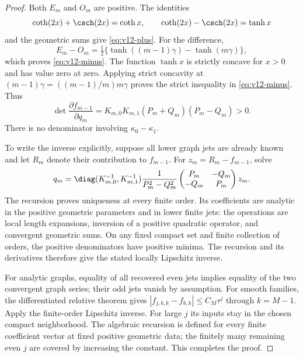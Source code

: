 \begin{proof}
Both $E_m$ and $O_m$ are positive. The identities
\[
 \coth(2x)+\csch(2x)=\coth x,\qquad
 \coth(2x)-\csch(2x)=\tanh x
\]
and the geometric sums give \eqref{eq:v12-plus}. For the difference,
\[
 E_m-O_m=\tfrac12\{\tanh((m-1)\gamma)-\tanh(m\gamma)\},
\]
which proves \eqref{eq:v12-minus}. The function $\tanh x$ is
strictly concave for $x>0$ and has value zero at zero. Applying
strict concavity at $(m-1)\gamma=((m-1)/m)m\gamma$ proves the
strict inequality in \eqref{eq:v12-minus}. Thus
\[
 \det\frac{\partial f_{m-1}}{\partial q_m}
       =K_{m,0}K_{m,1}(P_m+Q_m)(P_m-Q_m)>0.
\]
There is no denominator involving $\kappa_0-\kappa_1$.

To write the inverse explicitly, suppose all lower graph jets are
already known and let $R_m$ denote their contribution to $f_{m-1}$.
For $z_m=R_m-f_{m-1}$, solve
\begin{equation}\label{eq:v12-recursion}
 q_m=\diag(K_{m,0}^{-1},K_{m,1}^{-1})
        \frac1{P_m^2-Q_m^2}
       \begin{pmatrix}P_m&-Q_m\\-Q_m&P_m\end{pmatrix}z_m.
\end{equation}
The recursion proves uniqueness at every finite order. Its coefficients
are analytic in the positive geometric parameters and in lower finite
jets: the operations are local length expansions, inversion of a
positive quadratic operator, and convergent geometric sums. On any
fixed compact set and finite collection of orders, the positive
denominators have positive minima. The recursion and its derivatives
therefore give the stated locally Lipschitz inverse.

For analytic graphs, equality of all recovered even jets implies equality
of the two convergent graph series; their odd jets vanish by assumption.
For smooth families, the differentiated relative theorem gives
$|f_{j,b,k}-f_{b,k}|\le C_M\tau^j$ through $k=M-1$.
Apply the finite-order Lipschitz inverse. For large $j$ its inputs stay
in the chosen compact neighborhood. The algebraic recursion is defined
for every finite coefficient vector at fixed positive geometric data;
the finitely many remaining even $j$ are covered by increasing the
constant. This completes the proof.
\end{proof}

